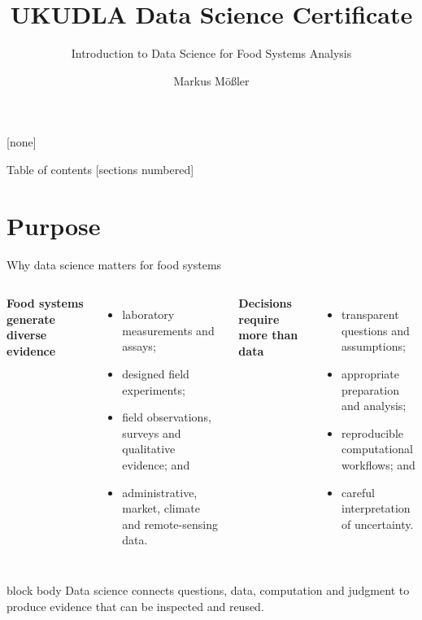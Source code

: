 \documentclass[10pt,aspectratio=169]{beamer}
\title{UKUDLA Data Science Certificate}
\subtitle{Introduction to Data Science for Food Systems Analysis}
\author{Markus Mößler}
\institute{University of Hohenheim}
\begin{document}
\maketitle

{
[none]
\begin{frame}[noframenumbering]{Table of contents}
  \small
  [sections numbered]
  \tableofcontents[hideallsubsections]
\end{frame}
}

\section{Purpose}

\begin{frame}{Why data science matters for food systems}
\small
\begin{columns}[T]
\textbf{Food systems generate diverse evidence}
\begin{itemize}
  \item laboratory measurements and assays;
  \item designed field experiments;
  \item field observations, surveys and qualitative evidence; and
  \item administrative, market, climate and remote-sensing data.
\end{itemize}
\textbf{Decisions require more than data}
\begin{itemize}
  \item transparent questions and assumptions;
  \item appropriate preparation and analysis;
  \item reproducible computational workflows; and
  \item careful interpretation of uncertainty.
\end{itemize}
\end{columns}
\vspace{0.35cm}
\begin{beamercolorbox}[rounded=true,sep=9pt]{block body}
Data science connects questions, data, computation and judgment to produce evidence that can be inspected and reused.
\end{beamercolorbox}
\end{frame}
\end{document}
